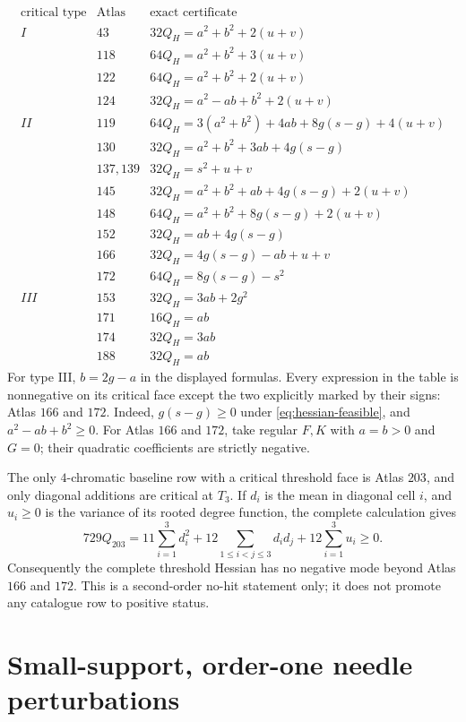 \documentclass[11pt]{article}
\begin{document}
\[
\begin{array}{c|c|l}
\text{critical type}&\text{Atlas}&\text{exact certificate}\\ \hline
I&43&32Q_H=a^2+b^2+2(u+v)\\
 &118&64Q_H=a^2+b^2+3(u+v)\\
 &122&64Q_H=a^2+b^2+2(u+v)\\
 &124&32Q_H=a^2-ab+b^2+2(u+v)\\ \hline
II&119&64Q_H=3(a^2+b^2)+4ab+8g(s-g)+4(u+v)\\
 &130&32Q_H=a^2+b^2+3ab+4g(s-g)\\
 &137,139&32Q_H=s^2+u+v\\
 &145&32Q_H=a^2+b^2+ab+4g(s-g)+2(u+v)\\
 &148&64Q_H=a^2+b^2+8g(s-g)+2(u+v)\\
 &152&32Q_H=ab+4g(s-g)\\
 &166&32Q_H=4g(s-g)-ab+u+v\\
 &172&64Q_H=8g(s-g)-s^2\\ \hline
III&153&32Q_H=3ab+2g^2\\
 &171&16Q_H=ab\\
 &174&32Q_H=3ab\\
 &188&32Q_H=ab
\end{array}
\]
For type III, $b=2g-a$ in the displayed formulas.  Every expression in the
table is nonnegative on its critical face except the two explicitly marked
by their signs: Atlas $166$ and $172$.  Indeed,
$g(s-g)\geq0$ under \eqref{eq:hessian-feasible}, and
$a^2-ab+b^2\geq0$.  For Atlas $166$ and $172$, take regular $F,K$ with
$a=b>0$ and $G=0$; their quadratic coefficients are strictly negative.

The only $4$-chromatic baseline row with a critical threshold face is Atlas
$203$, and only diagonal additions are critical at $T_3$.  If $d_i$ is the
mean in diagonal cell $i$, and $u_i\geq0$ is the variance of its rooted
degree function, the complete calculation gives
\[
 729Q_{203}
 =11\sum_{i=1}^3d_i^2
  +12\sum_{1\leq i<j\leq3}d_id_j
  +12\sum_{i=1}^3u_i
 \geq0.
\]
Consequently the complete threshold Hessian has no negative mode beyond
Atlas $166$ and $172$.  This is a second-order no-hit statement only; it
does not promote any catalogue row to positive status.


\section{Small-support, order-one needle perturbations}
\end{document}
